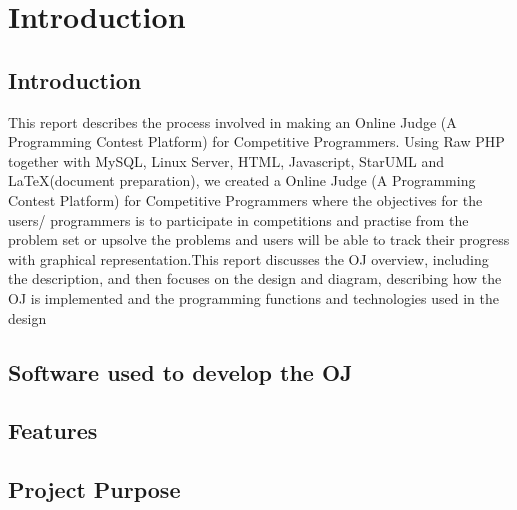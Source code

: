 
\chapter{Introduction}

\pagebreak


\section{Introduction}
This report describes the process involved in making an Online Judge (A Programming Contest Platform) for Competitive Programmers. Using Raw PHP together with MySQL, Linux Server, HTML, Javascript, StarUML and \LaTeX(document preparation), we created a Online Judge (A Programming Contest Platform) for Competitive Programmers where the objectives for the users/ programmers is to participate in competitions and practise from the problem set or upsolve the problems and users will be able to track their progress with graphical representation.This report discusses the OJ overview, including the description, and then focuses on the design and diagram, describing how the OJ is implemented and the programming functions and technologies used in the design


\section{Software used to develop the OJ}

\section{Features}

\section{Project Purpose}